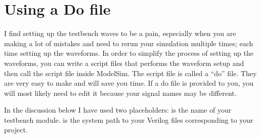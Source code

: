 \chapter{Using a Do file}
\graphicspath{ {./Lab00HowTo/howTo30 Using Do Files/Fig} }

I find setting up the testbench waves to be a pain, especially when you
are making a lot of mistakes and need to rerun your simulation multiple
times; each time setting up the waveforms. In order to simplify the
process of setting up the waveforms, you can write a script files that
performs the waveform setup and then call the script file inside
ModelSim. The script file is called a ``do'' file. They are very easy to
make and will save you time. If a do file is provided to you, you will
most likely need to edit it because your signal names may be different.

In the discussion below I have used two placeholders:
 is the name of your testbench module.
 is the system path to your
Verilog files corresponding to your project.

